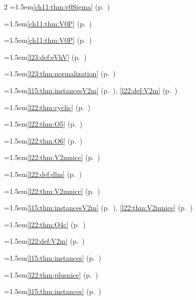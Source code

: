 \begin{multicols}{2}
\hangindent=1.5em\quad \ref{ch11:thm:v0Sigma} (p.~\pageref{ch11:thm:v0Sigma})\par
\hangindent=1.5em\quad \ref{ch11:thm:V0P} (p.~\pageref{ch11:thm:V0P})\par
\hangindent=1.5em\quad \ref{ch11:thm:V0P} (p.~\pageref{ch11:thm:V0P})\par
\hangindent=1.5em\quad \ref{l23:def:eVhV} (p.~\pageref{l23:def:eVhV})\par
\hangindent=1.5em\quad \ref{l23:thm:normalization} (p.~\pageref{l23:thm:normalization})\par
\hangindent=1.5em\quad \ref{l15:thm:instancesV2m} (p.~\pageref{l15:thm:instancesV2m}), \ref{l22:def:V2m} (p.~\pageref{l22:def:V2m})\par
\hangindent=1.5em\quad \ref{l22:thm:cyclic} (p.~\pageref{l22:thm:cyclic})\par
\hangindent=1.5em\quad \ref{l22:thm:O5} (p.~\pageref{l22:thm:O5})\par
\hangindent=1.5em\quad \ref{l22:thm:O6} (p.~\pageref{l22:thm:O6})\par
\hangindent=1.5em\quad \ref{l22:thm:V2mnice} (p.~\pageref{l22:thm:V2mnice})\par
\hangindent=1.5em\quad \ref{l22:def:dlm} (p.~\pageref{l22:def:dlm})\par
\hangindent=1.5em\quad \ref{l22:thm:V2mnice} (p.~\pageref{l22:thm:V2mnice})\par
\hangindent=1.5em\quad \ref{l15:thm:instancesV2m} (p.~\pageref{l15:thm:instancesV2m}), \ref{l22:thm:V2mnice} (p.~\pageref{l22:thm:V2mnice})\par
\hangindent=1.5em\quad \ref{l22:thm:O4c} (p.~\pageref{l22:thm:O4c})\par
\hangindent=1.5em\quad \ref{l22:def:V2m} (p.~\pageref{l22:def:V2m})\par
\hangindent=1.5em\quad \ref{l15:thm:instances} (p.~\pageref{l15:thm:instances})\par
\hangindent=1.5em\quad \ref{l22:thm:plusnice} (p.~\pageref{l22:thm:plusnice})\par
\hangindent=1.5em\quad \ref{l15:thm:instances} (p.~\pageref{l15:thm:instances})\par

\end{multicols}
